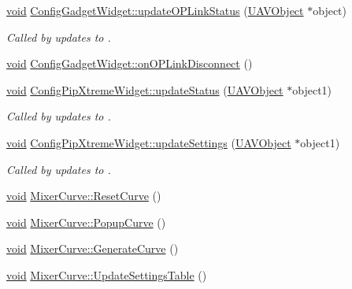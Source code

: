 \begin{DoxyCompactItemize}
\item 
\hyperlink{group___u_a_v_objects_plugin_ga444cf2ff3f0ecbe028adce838d373f5c}{void} \hyperlink{group___config_plugin_ga818055c405858506c9ae07240e0bfad7}{Config\-Gadget\-Widget\-::update\-O\-P\-Link\-Status} (\hyperlink{class_u_a_v_object}{U\-A\-V\-Object} $\ast$object)
\begin{DoxyCompactList}\small\item\em Called by updates to . \end{DoxyCompactList}\item 
\hyperlink{group___u_a_v_objects_plugin_ga444cf2ff3f0ecbe028adce838d373f5c}{void} \hyperlink{group___config_plugin_gaec8bc8bcd267141edd1fee6ca08c3a97}{Config\-Gadget\-Widget\-::on\-O\-P\-Link\-Disconnect} ()
\item 
\hyperlink{group___u_a_v_objects_plugin_ga444cf2ff3f0ecbe028adce838d373f5c}{void} \hyperlink{group___config_plugin_gabc0f7192a99a705a14adb140f5ede521}{Config\-Pip\-Xtreme\-Widget\-::update\-Status} (\hyperlink{class_u_a_v_object}{U\-A\-V\-Object} $\ast$object1)
\begin{DoxyCompactList}\small\item\em Called by updates to . \end{DoxyCompactList}\item 
\hyperlink{group___u_a_v_objects_plugin_ga444cf2ff3f0ecbe028adce838d373f5c}{void} \hyperlink{group___config_plugin_gabf6dbd1961284c12d242657add38d28c}{Config\-Pip\-Xtreme\-Widget\-::update\-Settings} (\hyperlink{class_u_a_v_object}{U\-A\-V\-Object} $\ast$object1)
\begin{DoxyCompactList}\small\item\em Called by updates to . \end{DoxyCompactList}\item 
\hyperlink{group___u_a_v_objects_plugin_ga444cf2ff3f0ecbe028adce838d373f5c}{void} \hyperlink{group___config_plugin_ga73b9d64b4c71bd3de1266b66707f8e3a}{Mixer\-Curve\-::\-Reset\-Curve} ()
\item 
\hyperlink{group___u_a_v_objects_plugin_ga444cf2ff3f0ecbe028adce838d373f5c}{void} \hyperlink{group___config_plugin_gaec9845f3048d0bb15ba6b31f4659888f}{Mixer\-Curve\-::\-Popup\-Curve} ()
\item 
\hyperlink{group___u_a_v_objects_plugin_ga444cf2ff3f0ecbe028adce838d373f5c}{void} \hyperlink{group___config_plugin_gad1f7dbb9fdd65436b5886e20fa930d27}{Mixer\-Curve\-::\-Generate\-Curve} ()
\item 
\hyperlink{group___u_a_v_objects_plugin_ga444cf2ff3f0ecbe028adce838d373f5c}{void} \hyperlink{group___config_plugin_gad4cb5385cbf5e389acf3fd394601df07}{Mixer\-Curve\-::\-Update\-Settings\-Table} ()

\end{DoxyCompactItemize}
